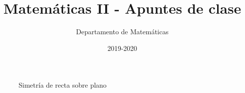 \documentclass[nobuilddate]{Docencia}
\title{Matemáticas II - Apuntes de clase}
\author{Departamento de Matemáticas}
\date{2019-2020}
\begin{document}
\begin{figure}[hbtp]
\centering
{}

\label{sim::recta-plano}
\caption{Simetría de recta sobre plano}
\end{figure}
\end{document}
